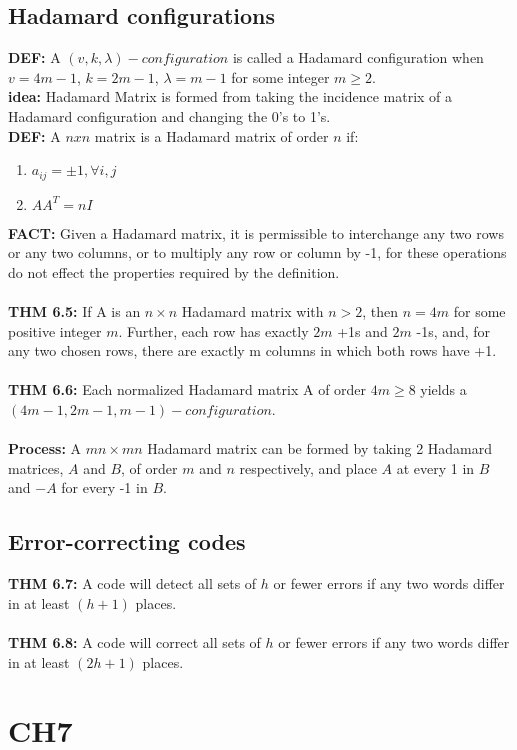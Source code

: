 \documentclass[12pt]{article}
\begin{document}
	\subsection{Hadamard configurations}
	\textbf{DEF: } A $ (v,k,\lambda)-configuration $ is called a Hadamard configuration  when $ v =
	4m-1 $, $ k = 2m -1 $, $ \lambda =	m - 	1 $ for some integer $ m\geq2 $. \\
	\textbf{idea: } Hadamard Matrix is formed from taking the incidence matrix of a Hadamard configuration and changing the 0's to 1's.\\
	\textbf{DEF: } A  $ nxn $ matrix is a Hadamard matrix of order $ n $ if:
	\begin{enumerate}
		\item$  a_{ij} = \pm1, \forall i,j$
		\item $ AA^T = nI $
	\end{enumerate}
	\textbf{FACT: } Given a Hadamard matrix, it is permissible to interchange any two	rows or any two columns, or to multiply any row or column by -1, for	these operations do not effect the properties required by the definition.\\\\
	\textbf{THM 6.5: } If A is an $ n\times n $ Hadamard matrix with $ n>2 $, then
	$ n= 4m $ for some positive integer $ m $. Further, each row has exactly $ 2m $ +1s
	and $ 2m $ -1s, and, for any two chosen rows, there are exactly m columns in which both rows have +1.\\\\
	\textbf{THM 6.6: } Each normalized Hadamard matrix A of order $ 4m \geq 8 $
	yields a $ (4m -1, 2m -	1,m -	1)-configuration $. \\\\
	\textbf{Process: } A $ mn\times mn $ Hadamard matrix can be formed by taking 2 Hadamard matrices, $ A $ and $ B $, of order $ m $ and $ n $ respectively, and place $ A $ at every 1 in $ B $ and $ -A $ for every -1 in $ B $.
	\subsection{Error-correcting codes}
	\textbf{THM 6.7: } A code will detect all sets of $ h $ or fewer errors if any	two words differ in at least $ (h + 1) $ places.\\\\
	\textbf{THM 6.8: } A code will correct all sets of $ h $ or fewer errors if any two words differ in at least $ (2h + 1) $ places.
	\section{CH7}
	
\end{document}
